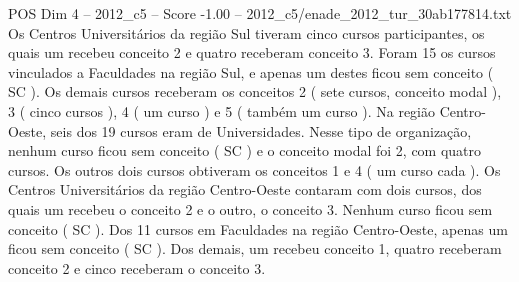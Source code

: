 \begin{textsample}{POS Dim 4 – 2012\_c5 – Score -1.00 – 2012\_c5/enade\_2012\_tur\_30ab177814.txt}
Os Centros Universitários da região Sul tiveram cinco cursos participantes, os quais um recebeu conceito 2 e quatro receberam conceito 3.
Foram 15 os cursos vinculados a Faculdades na região Sul, e apenas um destes ficou sem conceito ( SC ).
Os demais cursos receberam os conceitos 2 ( sete cursos, conceito modal ), 3 ( cinco cursos ), 4 ( um curso ) e 5 ( também um curso ).
Na região Centro-Oeste, seis dos 19 cursos eram de Universidades.
Nesse tipo de organização, nenhum curso ficou sem conceito ( SC ) e o conceito modal foi 2, com quatro cursos.
Os outros dois cursos obtiveram os conceitos 1 e 4 ( um curso cada ).
Os Centros Universitários da região Centro-Oeste contaram com dois cursos, dos quais um recebeu o conceito 2 e o outro, o conceito 3.
Nenhum curso ficou sem conceito ( SC ).
Dos 11 cursos em Faculdades na região Centro-Oeste, apenas um ficou sem conceito ( SC ).
Dos demais, um recebeu conceito 1, quatro receberam conceito 2 e cinco receberam o conceito 3.

\end{textsample}
